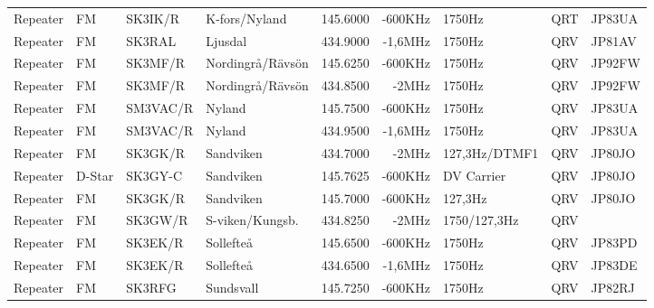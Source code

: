 \documentclass[10pt,swedish,a4paper,twoside]{article}
\begin{document}
\begin{landscape}
\begin{longtable}{llllrrlcl}
	Repeater          & FM           & SK3IK/R       & K-fors/Nyland    &          145.6000 &        -600KHz & 1750Hz          &       QRT       & JP83UA           \\
	Repeater          & FM           & SK3RAL        & Ljusdal          &          434.9000 &        -1,6MHz & 1750Hz          &       QRV       & JP81AV           \\
	Repeater          & FM           & SK3MF/R       & Nordingrå/Rävsön &          145.6250 &        -600KHz & 1750Hz          &       QRV       & JP92FW           \\
	Repeater          & FM           & SK3MF/R       & Nordingrå/Rävsön &          434.8500 &          -2MHz & 1750Hz          &       QRV       & JP92FW           \\
	Repeater          & FM           & SM3VAC/R      & Nyland           &          145.7500 &        -600KHz & 1750Hz          &       QRV       & JP83UA           \\
	Repeater          & FM           & SM3VAC/R      & Nyland           &          434.9500 &        -1,6MHz & 1750Hz          &       QRV       & JP83UA           \\
	Repeater          & FM           & SK3GK/R       & Sandviken        &          434.7000 &          -2MHz & 127,3Hz/DTMF1   &       QRV       & JP80JO           \\
	Repeater          & D-Star       & SK3GY-C       & Sandviken        &          145.7625 &        -600KHz & DV Carrier      &       QRV       & JP80JO           \\
	Repeater          & FM           & SK3GK/R       & Sandviken        &          145.7000 &        -600KHz & 127,3Hz         &       QRV       & JP80JO           \\
	Repeater          & FM           & SK3GW/R       & S-viken/Kungsb.  &          434.8250 &          -2MHz & 1750/127,3Hz    &       QRV       &  \\
	Repeater          & FM           & SK3EK/R       & Sollefteå        &          145.6500 &        -600KHz & 1750Hz          &       QRV       & JP83PD           \\
	Repeater          & FM           & SK3EK/R       & Sollefteå        &          434.6500 &        -1,6MHz & 1750Hz          &       QRV       & JP83DE           \\
	Repeater          & FM           & SK3RFG        & Sundsvall        &          145.7250 &        -600KHz & 1750Hz          &       QRV       & JP82RJ           \\

\end{longtable}
\end{landscape}
\end{document}

